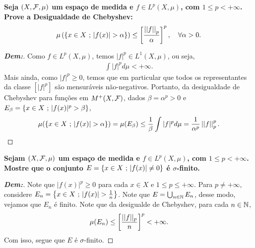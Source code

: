 \localtableofcontents
{}

\myexe{\thequatro}
\bigline
\textbf{Seja $(X, \mcal F, \mu)$ um espaço de medida e $f \in L^p(X, \mu)$, 
com $1 \le p < +\infty$. Prove a Desigualdade de Chebyshev:
\begin{align*}
  \mu\parth{\set{x \in X \st |f(x)| > \alpha}} \le \cparth{\frac{\pnorm p f}{\alpha}}^p, \quad \forall \alpha>0.
\end{align*}}
\begin{proof}[\textbf{Dem:}] Como $f \in L^p (X, \mu)$, temos $|f|^p \in L^1(X, \mu)$, ou seja, 
  \begin{align*}
    \int |f|^p d\mu < + \infty.
  \end{align*}
  Mais ainda, como $|f|^p \ge 0$, temos que em particular que todos os representantes da classe 
  $[|f|^p]$ são mensuráveis não-negativos. Portanto, 
  da desigualdade de Chebyshev para funções em $\fplus M (X, \mcal F)$, dados $\beta = \alpha^p > 0$ e
  $E_\beta = \set{x \in X \st |f(x)|^p > \beta}$,
  \begin{align*}
    \mu(\set{x \in X \st |f(x)| > \alpha}) = \mu(E_\beta) \le \frac{1}{\beta} \int |f|^p d\mu 
    = \frac{1}{\alpha^p} \pnorm p f^p.
  \end{align*}
\end{proof}
\bigline

\myexe{\thequatro}

\noindent 
\textbf{Sejam $(X, \mcal F, \mu)$ um espaço de medida e $f \in L^p (X, \mu)$, com $1 \le p < +\infty$. 
Mostre que o conjunto $E = \set{x \in X \st |f(x)| \neq 0}$ é $\sigma$-finito.}
\begin{proof}[\textbf{Dem:}] Note que $|f(x)|^p \ge 0$ para cada 
  $x \in X$ e $1 \le p \le +\infty$. Para $p \neq +\infty$, considere  
  $E_n = \set{x \in X \st |f(x)| > \frac{1}{n}}$. 
  Note que $E = \bigcup_{n \in \bN} E_n$, desse modo, vejamos que 
  $E_n$ é finito. Note que da desigualde de Chebyshev, para 
  cada $n \in \bN$,
  \begin{align*}
    \mu(E_n) \le \cparth{\frac{||f||_p}{n}}^p < +\infty.
  \end{align*}
  Com isso, segue que $E$ é $\sigma$-finito.
\end{proof}

